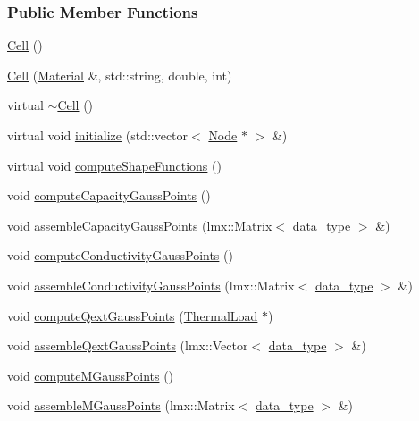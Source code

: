 \subsubsection*{Public Member Functions}
\begin{DoxyCompactItemize}
\item 
\hyperlink{classmknix_1_1_cell_a1c285cc4f38656550e8e2926058e8612}{Cell} ()
\item 
\hyperlink{classmknix_1_1_cell_ad0988ed8a4aac7c7440bee9413e1189f}{Cell} (\hyperlink{classmknix_1_1_material}{Material} \&, std\-::string, double, int)
\item 
virtual \hyperlink{classmknix_1_1_cell_ab4efc3f7c10212304dd776e7b58bb57b}{$\sim$\-Cell} ()
\item 
virtual void \hyperlink{classmknix_1_1_cell_a77d7851793538f99d8aa0ea664fa0fb7}{initialize} (std\-::vector$<$ \hyperlink{classmknix_1_1_node}{Node} $\ast$ $>$ \&)
\item 
virtual void \hyperlink{classmknix_1_1_cell_a6772f09fe6965faff4b53486b09f7235}{compute\-Shape\-Functions} ()
\item 
void \hyperlink{classmknix_1_1_cell_a675db1cafb39d5abab7b13994df21045}{compute\-Capacity\-Gauss\-Points} ()
\item 
void \hyperlink{classmknix_1_1_cell_a4d4af2c299e451b91a81819ccf5d6358}{assemble\-Capacity\-Gauss\-Points} (lmx\-::\-Matrix$<$ \hyperlink{namespacemknix_a16be4b246fbf2cceb141e3a179111020}{data\-\_\-type} $>$ \&)
\item 
void \hyperlink{classmknix_1_1_cell_a5d8c11ba58bbaa6f70d5dc2b530868e7}{compute\-Conductivity\-Gauss\-Points} ()
\item 
void \hyperlink{classmknix_1_1_cell_aae283c2a89beb517ed41b42bfdb19957}{assemble\-Conductivity\-Gauss\-Points} (lmx\-::\-Matrix$<$ \hyperlink{namespacemknix_a16be4b246fbf2cceb141e3a179111020}{data\-\_\-type} $>$ \&)
\item 
void \hyperlink{classmknix_1_1_cell_a45c2f8b146cafa0ba3a6503f70eb38a7}{compute\-Qext\-Gauss\-Points} (\hyperlink{classmknix_1_1_thermal_load}{Thermal\-Load} $\ast$)
\item 
void \hyperlink{classmknix_1_1_cell_a130944ac8867e93ce882e7cc8c3555ca}{assemble\-Qext\-Gauss\-Points} (lmx\-::\-Vector$<$ \hyperlink{namespacemknix_a16be4b246fbf2cceb141e3a179111020}{data\-\_\-type} $>$ \&)
\item 
void \hyperlink{classmknix_1_1_cell_a32a01eb5f854fc23353c0eb64b65e2da}{compute\-M\-Gauss\-Points} ()
\item 
void \hyperlink{classmknix_1_1_cell_a0b44063103766cd26b0411156c6d6004}{assemble\-M\-Gauss\-Points} (lmx\-::\-Matrix$<$ \hyperlink{namespacemknix_a16be4b246fbf2cceb141e3a179111020}{data\-\_\-type} $>$ \&)

\end{DoxyCompactItemize}
